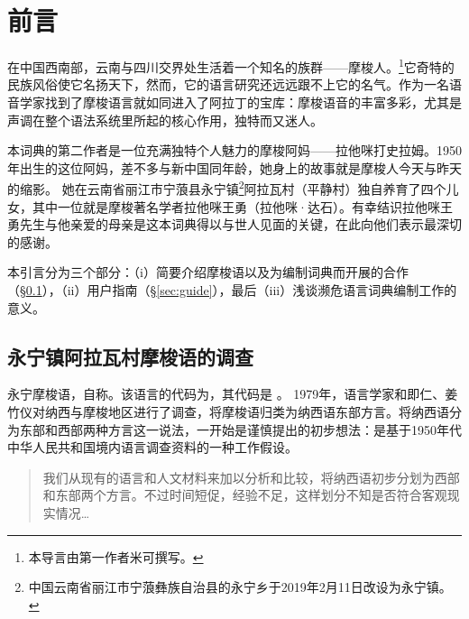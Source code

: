 \languecmncn

\chapter*{前言}


在中国西南部，云南与四川交界处生活着一个知名的族群——摩梭人。\footnote{本导言由第一作者米可撰写。}它奇特的民族风俗使它名扬天下，然而，它的语言研究还远远跟不上它的名气。作为一名语音学家找到了摩梭语言就如同进入了阿拉丁的宝库：摩梭语音的丰富多彩，尤其是声调在整个语法系统里所起的核心作用，独特而又迷人。

本词典的第二作者是一位充满独特个人魅力的摩梭阿妈——拉他咪打史拉姆。1950年出生的这位阿妈，差不多与新中国同年龄，她身上的故事就是摩梭人今天与昨天的缩影。
她在云南省丽江市宁蒗县永宁镇\footnote{中国云南省丽江市宁蒗彝族自治县的永宁乡于2019年2月11日改设为永宁镇。}阿拉瓦村（平静村）独自养育了四个儿女，其中一位就是摩梭著名学者拉他咪王勇（拉他咪·达石）。有幸结识拉他咪王勇先生与他亲爱的母亲是这本词典得以与世人见面的关键，在此向他们表示最深切的感谢。

本引言分为三个部分：（i）简要介绍摩梭语以及为编制词典而开展的合作（§\ref{sec:lang}），（ii）用户指南（§\ref{sec:guide}），最后（iii）浅谈濒危语言词典编制工作的意义。

\section{永宁镇阿拉瓦村摩梭语的调查}
\label{sec:lang}

永宁摩梭语，自称。该语言的代码为\parencite{lewisetal2016}，其代码是 \parencite{Nordhoff2012}。
1979年，语言学家和即仁、姜竹仪对纳西与摩梭地区进行了调查，将摩梭语归类为纳西语东部方言\parencite[4, 104--116]{heetal1985}。将{纳西语}分为东部和西部两种方言这一说法，一开始是谨慎提出的初步想法：是基于1950年代中华人民共和国境内语言调查资料的一种工作假设。

\begin{quotation}
我们从现有的语言和人文材料来加以分析和比较，将纳西语初步分划为西部和东部两个{方言}。不过时间短促，经验不足，这样划分不知是否符合客观现实情况{\dots}\parencite[120]{heetal1988}
\end{quotation}

